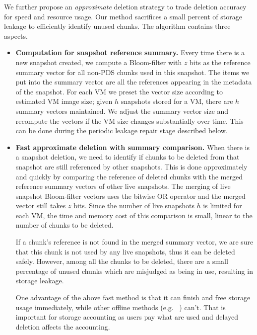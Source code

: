 We further propose an {\em approximate} deletion strategy to trade deletion accuracy for
speed and resource usage. Our method sacrifices a small percent of storage leakage
to efficiently identify unused chunks.
The algorithm contains three aspects.
\begin{itemize}
\item {\bf Computation for snapshot reference summary.}
Every time there is a new snapshot created,
we compute a Bloom-filter with $z$ bits as the reference summary vector for all non-PDS chunks used 
in this snapshot.
The items we put into the summary vector are all the references appearing in the metadata of the snapshot.
For each VM we preset the vector size according to estimated VM image size;
given $h$ snapshots stored for a VM, there are $h$ summary vectors maintained.
We adjust the summary vector size and recompute the vectors if the VM size changes substantially over time.
This can be done during the periodic leakage repair stage described below.

\item {\bf Fast approximate deletion with summary comparison.}
When there is a snapshot deletion,  
we need to identify if chunks to be deleted from that snapshot
are still referenced by other snapshots. 
This is done approximately and quickly by comparing the 
reference of deleted chunks  with
the merged reference summary vectors of other live snapshots.
The merging of live snapshot Bloom-filter vectors uses the bitwise OR operator 
and the merged vector still takes $z$ bits.
Since the number of live snapshots $h$ is limited for
each VM, 
the time and memory cost of this comparison is small, linear to the number of chunks to be deleted.

If a chunk's reference is not found in the merged summary vector, we are sure that
this chunk is not used by any live snapshots, thus it can be deleted safely.
However, among all the chunks to be deleted, 
there are a small percentage of unused chunks  which
are misjudged as  being in use, resulting in storage leakage.

One advantage of the above fast method is that it can finish  and free storage 
usage immediately, while other offline methods (e.g. ~\cite{Guo2011,Fabiano2013})
can't. That is important for storage accounting as users pay what are used and delayed deletion
affects the accounting.


\end{itemize}
